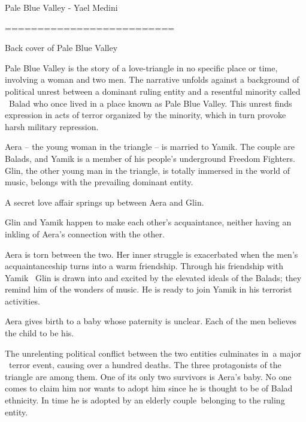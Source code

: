 \documentclass[letterpaper]{article}
\title{}
\author{[5D9?][5E2?][5DC?]}
\date{2020-07-20}
\begin{document}
\clearpage\setcounter{page}{1}\pagestyle{Standard}

\bigskip

Pale Blue Valley - Yael Medini 

==========================


\bigskip


\bigskip

\textcolor[rgb]{0.13333334,0.13333334,0.13333334}{Back cover of Pale Blue Valley}


\bigskip

\textcolor[rgb]{0.13333334,0.13333334,0.13333334}{Pale Blue Valley is the story of a love-triangle in no specific place
or time, involving a woman and two men. The narrative unfolds against a background of political unrest between a
dominant ruling entity and a resentful minority called \ Balad who once lived in a place known as Pale Blue Valley.
This unrest finds expression in acts of terror organized by the minority, which in turn provoke harsh military
repression.}

\textcolor[rgb]{0.13333334,0.13333334,0.13333334}{Aera -- the young woman in the triangle -- is married to Yamik. The
couple are Balads, and Yamik is a member of his people's underground Freedom Fighters. Glin, the other young man in the
triangle, is totally immersed in the world of music, belongs with the prevailing dominant entity. \ }

\textcolor[rgb]{0.13333334,0.13333334,0.13333334}{A secret love affair springs up between Aera and Glin. \ }

\textcolor[rgb]{0.13333334,0.13333334,0.13333334}{Glin and Yamik happen to make each other's acquaintance, neither
having an inkling of Aera's connection with the other.}

\textcolor[rgb]{0.13333334,0.13333334,0.13333334}{Aera is torn between the two. Her inner struggle is exacerbated when
the men's acquaintanceship turns into a warm friendship. Through his friendship with Yamik \ Glin is drawn into and
excited by the elevated ideals of the Balads; they remind him of the wonders of music. He is ready to join Yamik in his
terrorist activities.}

\textcolor[rgb]{0.13333334,0.13333334,0.13333334}{Aera gives birth to a baby whose paternity is unclear. Each of the men
believes the child to be his.}

\textcolor[rgb]{0.13333334,0.13333334,0.13333334}{The unrelenting political conflict between the two entities culminates
in~a major \ terror event, causing over a hundred deaths. The three protagonists of the
{\textquotedbl}triangle{\textquotedbl} are among them. One of its only two survivors is Aera's baby. No one comes to
claim him nor wants to adopt him since he is thought to be of Balad ethnicity. In time he is adopted by an elderly
couple~belonging to the ruling entity. }
\end{document}

